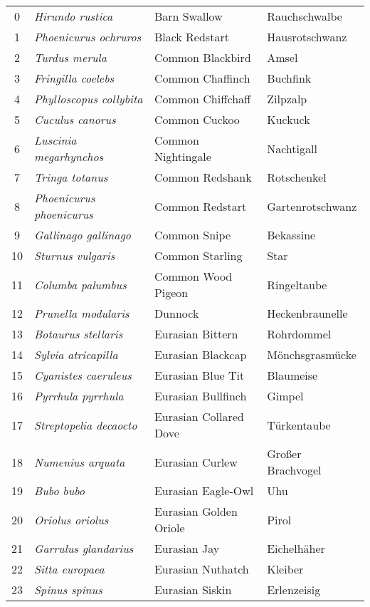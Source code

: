 \begin{longtable}{clll}
    \bottomrule
    \endlastfoot
    \small
    0 & \textit{Hirundo rustica} & Barn Swallow & Rauchschwalbe \\
    1 & \textit{Phoenicurus ochruros} & Black Redstart & Hausrotschwanz \\
    2 & \textit{Turdus merula} & Common Blackbird & Amsel \\
    3 & \textit{Fringilla coelebs} & Common Chaffinch & Buchfink \\
    4 & \textit{Phylloscopus collybita} & Common Chiffchaff & Zilpzalp \\
    5 & \textit{Cuculus canorus} & Common Cuckoo & Kuckuck \\
    6 & \textit{Luscinia megarhynchos} & Common Nightingale & Nachtigall \\
    7 & \textit{Tringa totanus} & Common Redshank & Rotschenkel \\
    8 & \textit{Phoenicurus phoenicurus} & Common Redstart & Gartenrotschwanz \\
    9 & \textit{Gallinago gallinago} & Common Snipe & Bekassine \\
    10 & \textit{Sturnus vulgaris} & Common Starling & Star \\
    11 & \textit{Columba palumbus} & Common Wood Pigeon & Ringeltaube \\
    12 & \textit{Prunella modularis} & Dunnock & Heckenbraunelle \\
    13 & \textit{Botaurus stellaris} & Eurasian Bittern & Rohrdommel \\
    14 & \textit{Sylvia atricapilla} & Eurasian Blackcap & Mönchsgrasmücke \\
    15 & \textit{Cyanistes caeruleus} & Eurasian Blue Tit & Blaumeise \\
    16 & \textit{Pyrrhula pyrrhula} & Eurasian Bullfinch & Gimpel \\
    17 & \textit{Streptopelia decaocto} & Eurasian Collared Dove & Türkentaube \\
    18 & \textit{Numenius arquata} & Eurasian Curlew & Großer Brachvogel \\
    19 & \textit{Bubo bubo} & Eurasian Eagle-Owl & Uhu \\
    20 & \textit{Oriolus oriolus} & Eurasian Golden Oriole & Pirol \\
    21 & \textit{Garrulus glandarius} & Eurasian Jay & Eichelhäher \\
    22 & \textit{Sitta europaea} & Eurasian Nuthatch & Kleiber \\
    23 & \textit{Spinus spinus} & Eurasian Siskin & Erlenzeisig \\

\end{longtable}
